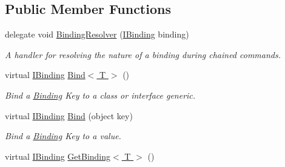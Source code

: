 \subsection*{Public Member Functions}
\begin{DoxyCompactItemize}
\item 
\hypertarget{classstrange_1_1framework_1_1impl_1_1_binder_aa4e977fc31063ca4d0b029b1abe39dad}{delegate void \hyperlink{classstrange_1_1framework_1_1impl_1_1_binder_aa4e977fc31063ca4d0b029b1abe39dad}{Binding\-Resolver} (\hyperlink{interfacestrange_1_1framework_1_1api_1_1_i_binding}{I\-Binding} binding)}\label{classstrange_1_1framework_1_1impl_1_1_binder_aa4e977fc31063ca4d0b029b1abe39dad}

\begin{DoxyCompactList}\small\item\em A handler for resolving the nature of a binding during chained commands. \end{DoxyCompactList}\item 
\hypertarget{classstrange_1_1framework_1_1impl_1_1_binder_aa809b66eeb6dec84b6cbb0b1b80f5b04}{virtual \hyperlink{interfacestrange_1_1framework_1_1api_1_1_i_binding}{I\-Binding} \hyperlink{classstrange_1_1framework_1_1impl_1_1_binder_aa809b66eeb6dec84b6cbb0b1b80f5b04}{Bind$<$ T $>$} ()}\label{classstrange_1_1framework_1_1impl_1_1_binder_aa809b66eeb6dec84b6cbb0b1b80f5b04}

\begin{DoxyCompactList}\small\item\em Bind a \hyperlink{classstrange_1_1framework_1_1impl_1_1_binding}{Binding} Key to a class or interface generic. \end{DoxyCompactList}\item 
\hypertarget{classstrange_1_1framework_1_1impl_1_1_binder_aa10f64af425a6c7321b91d0db75cd4c7}{virtual \hyperlink{interfacestrange_1_1framework_1_1api_1_1_i_binding}{I\-Binding} \hyperlink{classstrange_1_1framework_1_1impl_1_1_binder_aa10f64af425a6c7321b91d0db75cd4c7}{Bind} (object key)}\label{classstrange_1_1framework_1_1impl_1_1_binder_aa10f64af425a6c7321b91d0db75cd4c7}

\begin{DoxyCompactList}\small\item\em Bind a \hyperlink{classstrange_1_1framework_1_1impl_1_1_binding}{Binding} Key to a value. \end{DoxyCompactList}\item 
\hypertarget{classstrange_1_1framework_1_1impl_1_1_binder_a63db76e9141c81d2e71b0d9a3c1b0a6b}{virtual \hyperlink{interfacestrange_1_1framework_1_1api_1_1_i_binding}{I\-Binding} \hyperlink{classstrange_1_1framework_1_1impl_1_1_binder_a63db76e9141c81d2e71b0d9a3c1b0a6b}{Get\-Binding$<$ T $>$} ()}\label{classstrange_1_1framework_1_1impl_1_1_binder_a63db76e9141c81d2e71b0d9a3c1b0a6b}


\end{DoxyCompactItemize}
